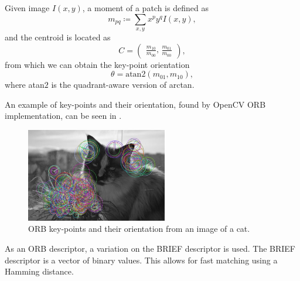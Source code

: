 Given image $I(x,y)$, a moment of a patch is defined as
\begin{equation}
    m_{pq}\coloneqq\sum_{x,y} x^p y^q I(x,y),
\end{equation}
and the centroid is located as
\begin{equation}
    C =
    \begin{pmatrix}
        \frac{m_{10}}{m_{00}} \text{, } \frac{m_{01}}{m_{00}}
    \end{pmatrix},
\end{equation}
from which we can obtain the key-point orientation
\begin{equation}
    \theta = \text{atan}2(m_{01},m_{10}),
\end{equation}
where atan$2$ is the quadrant-aware version of arctan.

An example of key-points and their orientation, found by OpenCV ORB implementation, can be seen in .
\begin{figure}[ht!]
    \centering
    \includegraphics[width=0.55\textwidth]{Figures/orb/orb_example.jpg}
    \caption[ORB key-points and their orientation from an image of a cat]{ORB key-points and their orientation from an image of a cat.}
    \label{fig:orb_example}
\end{figure}

As an ORB descriptor, a variation on the BRIEF descriptor is used. The BRIEF descriptor is a vector of binary values. This allows for fast matching using a Hamming distance.

